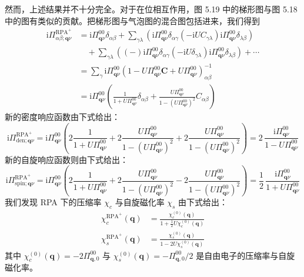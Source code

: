 然而，上述结果并不十分完全。对于在位相互作用，图 5.19 中的梯形图与图 5.18 中的图有类似的贡献。把梯形图与气泡图的混合图包括进来，我们得到
\begin{align*}
\mathrm{i}\Pi^{\mathrm{RPA}^{+}}_{\alpha\beta;\pmb{q}\nu}&=\mathrm{i}\Pi^{00}_{\pmb{q}\nu}\delta_{\alpha\beta}+\sum_{\gamma\lambda}\left(\mathrm{i}\Pi^{00}_{\pmb{q}\nu}\delta_{\alpha\gamma}(-\mathrm{i}UC_{\gamma\lambda})\mathrm{i}\Pi^{00}_{\pmb{q}\nu}\delta_{\lambda\beta}\right)\\
&\quad+\sum_{\gamma\lambda}\left((-)\mathrm{i}\Pi^{00}_{\pmb{q}\nu}\delta_{\alpha\gamma}(-\mathrm{i}U\delta_{\gamma\lambda})\mathrm{i}\Pi^{00}_{\pmb{q}\nu}\delta_{\lambda\beta}\right)+\cdots\\
&=\sum_{\gamma}\mathrm{i}\Pi^{00}_{\pmb{q}\nu}\left(1-U\Pi^{00}_{\pmb{q}\nu}\pmb{C}+U\Pi^{00}_{\pmb{q}\nu}\right)^{-1}_{\alpha\beta}\\
&=\mathrm{i}\Pi^{00}_{\pmb{q}\nu}\left(\frac{1}{1+U\Pi^{00}_{\pmb{q}\nu}}\delta_{\alpha\beta}+\frac{U\Pi^{00}_{\pmb{q}\nu}}{1-(U\Pi^{00}_{\pmb{q}\nu})^{2}}C_{\alpha\beta}\right)
\end{align*}
新的密度响应函数由下式给出：
\begin{equation*}
\mathrm{i}\Pi^{\mathrm{RPA}^{+}}_{\mathrm{den};\pmb{q}\nu}=\mathrm{i}\Pi^{00}_{\pmb{q}\nu}\left(2\frac{1}{1+U\Pi^{00}_{\pmb{q}\nu}}+2\frac{U\Pi^{00}_{\pmb{q}\nu}}{1-(U\Pi^{00}_{\pmb{q}\nu})^{2}}+2\frac{U\Pi^{00}_{\pmb{q}\nu}}{1-(U\Pi^{00}_{\pmb{q}\nu})^{2}}\right)=2\,\frac{\mathrm{i}\Pi^{00}_{\pmb{q}\nu}}{1-U\Pi^{00}_{\pmb{q}\nu}}
\end{equation*}
新的自旋响应函数则由下式给出：
\begin{equation*}
\mathrm{i}\Pi^{\mathrm{RPA}^{+}}_{\mathrm{spin};\pmb{q}\nu}=\mathrm{i}\Pi^{00}_{\pmb{q}\nu}\left(2\frac{1}{1+U\Pi^{00}_{\pmb{q}\nu}}+2\frac{U\Pi^{00}_{\pmb{q}\nu}}{1-(U\Pi^{00}_{\pmb{q}\nu})^{2}}-2\frac{U\Pi^{00}_{\pmb{q}\nu}}{1-(U\Pi^{00}_{\pmb{q}\nu})^{2}}\right)=\frac{1}{2}\,\frac{\mathrm{i}\Pi^{00}_{\pmb{q}\nu}}{1+U\Pi^{00}_{\pmb{q}\nu}}
\end{equation*}
我们发现 RPA 下的压缩率 $\chi_{c}$ 与自旋磁化率 $\chi_{s}$ 由下式给出：
\begin{align*}
\chi^{\mathrm{RPA}^{+}}_{c}(\pmb{q})&=\frac{\chi^{(0)}_{c}(\pmb{q})}{1+\frac{1}{2}U\chi^{(0)}_{c}(\pmb{q})}\\
\chi^{\mathrm{RPA}^{+}}_{s}(\pmb{q})&=\frac{\chi^{(0)}_{s}(\pmb{q})}{1-2U\chi^{(0)}_{s}(\pmb{q})}
\end{align*}
其中 $\chi^{(0)}_{c}(\pmb{q})=-2\Pi^{00}_{\pmb{q},0}$ 与 $\chi^{(0)}_{s}(\pmb{q})=-\Pi^{00}_{\pmb{q},0}/2$ 是自由电子的压缩率与自旋磁化率。

